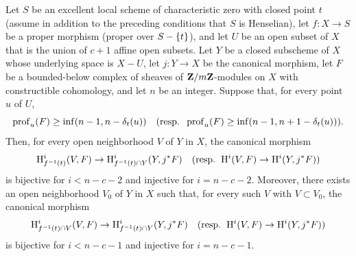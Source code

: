 \begin{proposition} \label{XIV.4.9}
Let $S$ be an excellent local scheme of characteristic zero with closed point $t$ (\resp assume in addition to the preceding conditions that $S$ is Henselian), let $f\colon X\to S$ be a proper morphism (\resp proper over $S-\{ \sisi{s}{t}\}$), and let $U$ be an open subset of $X$ that is the union of $c+1$ affine open subsets. Let $Y$ be a closed subscheme of $X$ whose underlying space is $X-U$, let $j\colon Y\to X$ be the canonical morphism, let $F$ be a bounded-below complex of sheaves of $\ZZ/m\ZZ$-modules on $X$ with constructible cohomology, and let $n$ be an integer. Suppose that, for every point $u$ of $U$,
$$
\prof_{u}(F)\geq\inf(n-1, n-\delta_{t}(u))\quad(\textrm{\resp }\;\prof_{u}(F)\geq\inf(n-1, n+1-\delta_{t}(u))).
$$
Then, for every open neighborhood $V$ of $Y$ in $X$, the canonical morphism\pageoriginale
$$
\H_{f^{-1}(t)}^{i}(V, F)\to\H_{f^{-1}(t)\cap Y}^{i}(Y, j^{\ast}F)\quad(\textrm{\resp }\;\H^{i}(V, F)\to\H^{i}(Y, j^{\ast}F))
$$
is bijective for $i<n-c-2$ and injective for $i=n-c-2$. Moreover, there exists an open neighborhood $V_{0}$ of $Y$ in $X$ such that, for every such $V$ with $V\subset V_{0}$, the canonical morphism
$$
\H_{f^{-1}(t)\cap V}^{i}(V, F)\to\H_{f^{-1}(t)\cap Y}^{i}(Y, j^{\ast}F)\quad(\textrm{\resp }\;\H^{i}(V, F)\to\H^{i}(Y, j^{\ast}F))
$$
is bijective for $i<n-c-1$ and injective for $i=n-c-1$.
\end{proposition}

